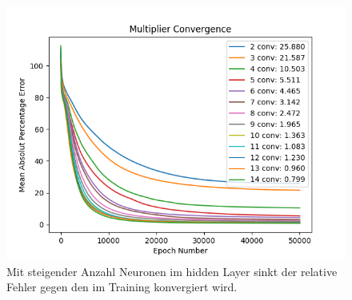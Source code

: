 \begin{figure}
	\centering
	\includegraphics[scale=0.7]{learning/img/loss.png}
	\caption{Mit steigender Anzahl Neuronen im hidden Layer
	sinkt der relative Fehler gegen den im Training konvergiert
	wird.
	\label{fig:mst_loss} }
\end{figure}


